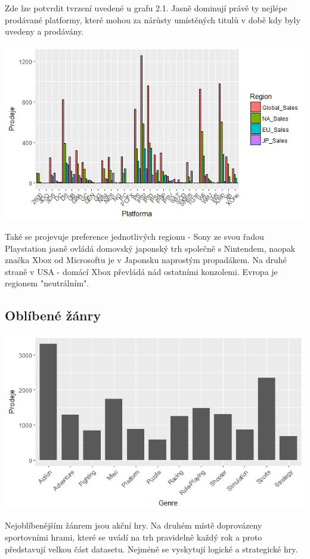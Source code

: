 \documentclass[a4paper,11pt]{article}
\begin{document}
Zde lze potvrdit tvrzení uvedené u grafu 2.1. Jasně dominují právě ty nejlépe prodávané platformy, které mohou za nárůsty umístěných titulů v době kdy byly uvedeny a prodávány. 



\includegraphics[scale=0.9]{Rplot02}

Také se projevuje preference jednotlivých regionu - Sony ze svou řadou Playstation jasně ovládá domovský japonský trh společně s Nintendem, naopak značka Xbox od Microsoftu je v Japonsku naprostým propadákem. Na druhé straně v USA - domácí Xbox převládá nád ostatními konzolemi. Evropa je regionem "neutrálním".

\newpage

\subsection{Oblíbené žánry}

\includegraphics[scale=0.75]{Rplot04}

Nejoblíbenějším žánrem jsou akční hry. Na druhém místě doprovázeny sportovními hrami, které se uvádí na trh pravidelně každý rok a proto představují velkou část datasetu. Nejméně se vyskytují logické a strategické hry.
\end{document}
